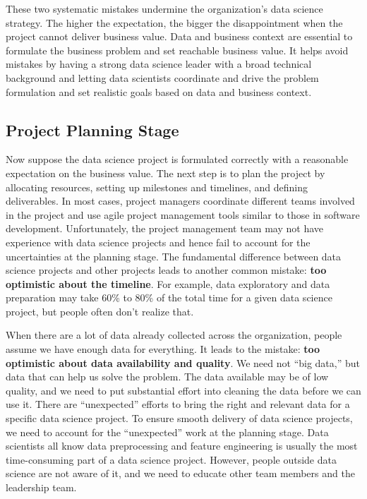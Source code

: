 \documentclass[12pt,]{krantz}
\begin{document}
These two systematic mistakes undermine the organization's data science strategy. The higher the expectation, the bigger the disappointment when the project cannot deliver business value. Data and business context are essential to formulate the business problem and set reachable business value. It helps avoid mistakes by having a strong data science leader with a broad technical background and letting data scientists coordinate and drive the problem formulation and set realistic goals based on data and business context.

\hypertarget{project-planning-stage}{%
\subsection{Project Planning Stage}\label{project-planning-stage}}

Now suppose the data science project is formulated correctly with a reasonable expectation on the business value. The next step is to plan the project by allocating resources, setting up milestones and timelines, and defining deliverables. In most cases, project managers coordinate different teams involved in the project and use agile project management tools similar to those in software development. Unfortunately, the project management team may not have experience with data science projects and hence fail to account for the uncertainties at the planning stage. The fundamental difference between data science projects and other projects leads to another common mistake: \textbf{too optimistic about the timeline}. For example, data exploratory and data preparation may take 60\% to 80\% of the total time for a given data science project, but people often don't realize that.

When there are a lot of data already collected across the organization, people assume we have enough data for everything. It leads to the mistake: \textbf{too optimistic about data availability and quality}. We need not ``big data,'' but data that can help us solve the problem. The data available may be of low quality, and we need to put substantial effort into cleaning the data before we can use it. There are ``unexpected'' efforts to bring the right and relevant data for a specific data science project. To ensure smooth delivery of data science projects, we need to account for the ``unexpected'' work at the planning stage. Data scientists all know data preprocessing and feature engineering is usually the most time-consuming part of a data science project. However, people outside data science are not aware of it, and we need to educate other team members and the leadership team.
\end{document}
